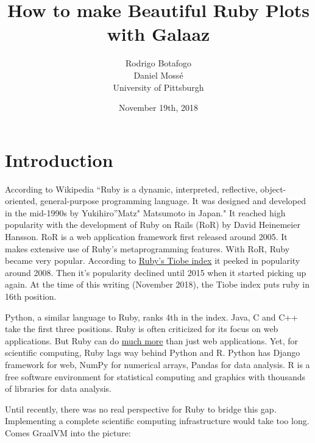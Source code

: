 \documentclass[11pt,]{article}
\title{How to make Beautiful Ruby Plots with Galaaz}
\author{Rodrigo Botafogo \\ Daniel Mossé \\ University of Pittsburgh}
\date{November 19th, 2018}
\begin{document}
\maketitle

{
\setcounter{tocdepth}{2}
\tableofcontents
}
\section{Introduction}\label{introduction}

According to Wikipedia ``Ruby is a dynamic, interpreted, reflective,
object-oriented, general-purpose programming language. It was designed
and developed in the mid-1990s by Yukihiro''Matz" Matsumoto in Japan."
It reached high popularity with the development of Ruby on Rails (RoR)
by David Heinemeier Hansson. RoR is a web application framework first
released around 2005. It makes extensive use of Ruby's metaprogramming
features. With RoR, Ruby became very popular. According to
\href{https://www.tiobe.com/tiobe-index/ruby/}{Ruby's Tiobe index} it
peeked in popularity around 2008. Then it's popularity declined until
2015 when it started picking up again. At the time of this writing
(November 2018), the Tiobe index puts ruby in 16th position.

Python, a similar language to Ruby, ranks 4th in the index. Java, C and
C++ take the first three positions. Ruby is often criticized for its
focus on web applications. But Ruby can do
\href{https://github.com/markets/awesome-ruby}{much more} than just web
applications. Yet, for scientific computing, Ruby lags way behind Python
and R. Python has Django framework for web, NumPy for numerical arrays,
Pandas for data analysis. R is a free software environment for
statistical computing and graphics with thousands of libraries for data
analysis.

Until recently, there was no real perspective for Ruby to bridge this
gap. Implementing a complete scientific computing infrastructure would
take too long. Comes GraalVM into the picture:
\end{document}
